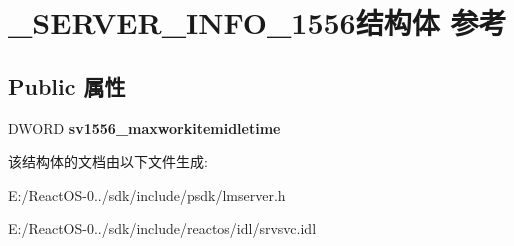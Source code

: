 \hypertarget{struct___s_e_r_v_e_r___i_n_f_o__1556}{}\section{\+\_\+\+S\+E\+R\+V\+E\+R\+\_\+\+I\+N\+F\+O\+\_\+1556结构体 参考}
\label{struct___s_e_r_v_e_r___i_n_f_o__1556}
\subsection*{Public 属性}
\begin{DoxyCompactItemize}
\item 
\mbox{\label{struct___s_e_r_v_e_r___i_n_f_o__1556_a963b6aa9fdaa91e540c33bf931a900ca}} 
D\+W\+O\+RD {\bfseries sv1556\+\_\+maxworkitemidletime}
\end{DoxyCompactItemize}


该结构体的文档由以下文件生成\+:\begin{DoxyCompactItemize}
\item 
E\+:/\+React\+O\+S-\/0../sdk/include/psdk/lmserver.\+h\item 
E\+:/\+React\+O\+S-\/0../sdk/include/reactos/idl/srvsvc.\+idl\end{DoxyCompactItemize}
